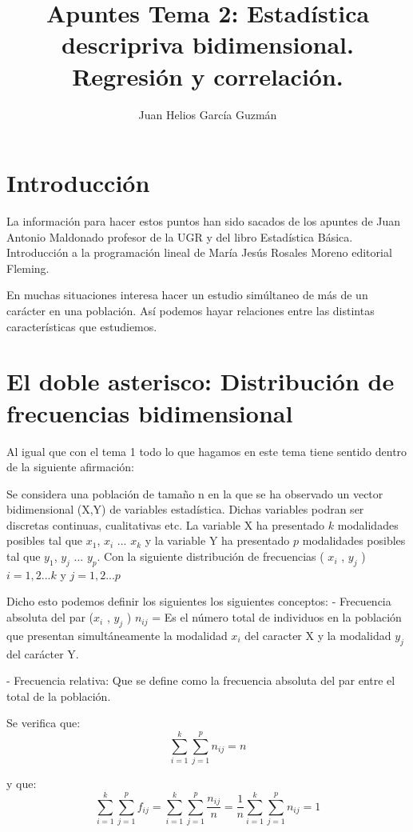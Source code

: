 \documentclass{article}
\begin{document}
	\author{Juan Helios García Guzmán}
	\large
	\title{ %
	Apuntes Tema 2: Estadística descripriva bidimensional. Regresión y correlación. \\
	 }
	\maketitle
	

 \section{Introducción}
	La información para hacer estos puntos han sido sacados de los apuntes de Juan Antonio Maldonado profesor de la UGR y del libro Estadística Básica. Introducción a la programación lineal de María Jesús Rosales Moreno editorial Fleming. 
 
 En muchas situaciones interesa hacer un estudio simúltaneo de más de un carácter en una población. Así podemos hayar relaciones entre las distintas características que estudiemos.
 \section{El doble asterisco: Distribución de frecuencias bidimensional}
 Al igual que con el tema 1 todo lo que hagamos en este tema tiene sentido dentro de la siguiente afirmación:
 
 Se considera una población de tamaño n en la que se ha observado un vector bidimensional (X,Y) de variables estadística. Dichas variables podran ser discretas continuas, cualitativas etc. La variable X ha presentado $k$ modalidades posibles tal que $x_1$, $x_i$ ... $x_k$ y la variable Y ha presentado $p$ modalidades posibles tal que $y_1$, $y_j$ ... $y_p$. Con la siguiente distribución de frecuencias ( $x_i$ , $y_j$ ) $ i = 1,2 ... k $ y $ j = 1,2 ... p $
 
 Dicho esto podemos definir los siguientes los siguientes conceptos:
  - Frecuencia absoluta del par ($x_i$ , $y_j$ ) $n_{ij}$ = Es el número total de individuos en la población que presentan simultáneamente la modalidad $x_i$ del caracter X y la modalidad $y_j$ del carácter Y. 
  
  
  - Frecuencia relativa: Que se define como la frecuencia absoluta del par entre el total de la población. 
  
  Se verifica que:    $$ \sum_{i=1}^{k} \sum_{j=1}^{p} n_{ij} = n$$
  
  y que: $$\sum_{i=1}^{k} \sum_{j=1}^{p} f_{ij} = \sum_{i=1}^{k} \sum_{j=1}^{p} \frac{n_{ij}}{n} = \frac{1}{n} \sum_{i=1}^{k} \sum_{j=1}^{p} n_{ij} = 1$$
 
\end{document}
